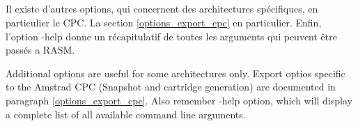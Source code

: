 


\subsection{}

\begin{xfr}
  Il existe d'autres options, qui concernent des architectures spécifiques, en particulier le CPC. La section \ref{options_export_cpc} en particulier.
  Enfin, l'option -help donne un récapitulatif de toutes les arguments qui peuvent être passés a RASM.
\end{xfr}

\begin{xen}
  Additional options are useful for some architectures only. Export optios specific to the Amstrad CPC (Snapshot and cartridge generation) are documented in paragraph \ref{options_export_cpc}.
  Also remember -help option, which will display a complete list of all available command line arguments.
\end{xen}
